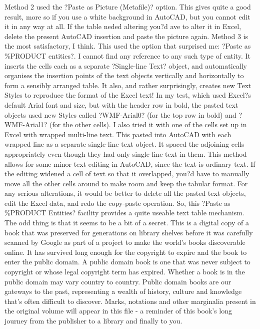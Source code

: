 \documentclass[a4paper]{article}
\begin{document}
{Method 2 used the ?Paste as Picture (Metafile)? option. This gives quite a good result, more so if you use a white background in AutoCAD, but you cannot edit it in any way at all. If the table neded altering you?d ave to alter it in Excel, delete the present AutoCAD insertion and paste the picture again.
Method 3 is the most satisfactory, I think. This used the option that surprised me: ?Paste as \%PRODUCT entities?. I cannot find any reference to any such type of entity. It inserts the cells each as a separate ?Single-line Text? object, and automatically organises the insertion points of the text objects vertically and horizontally to form a sensibly arranged table. It also, and rather surprisingly, creates new Text Styles to reproduce the format of the Excel text! In my test, which used Excel?s default Arial font and size, but with the header row in bold, the pasted text objects used new Styles called ?WMF-Arial0? (for the top row in bold) and ?WMF-Arial1? (for the other cells).
I also tried it with one of the cells set up in Excel with wrapped multi-line text. This pasted into AutoCAD with each wrapped line as a separate single-line text object. It spaced the adjoining cells appropriately even though they had only single-line text in them.
This method allows for some minor text editing in AutoCAD, since the text is ordinary text. If the editing widened a cell of text so that it overlapped, you?d have to manually move all the other cells around to make room and keep the tabular format. For any serious alterations, it would be better to delete all the pasted text objects, edit the Excel data, and redo the copy-paste operation.
So, this ?Paste as \%PRODUCT Entities? facility provides a quite useable text table mechanism. The odd thing is that it seems to be a bit of a secret.
This is a digital copy of a book that was preserved for generations on library shelves before it was carefully scanned by Google as part of a project 
to make the world's books discoverable online. 
It has survived long enough for the copyright to expire and the book to enter the public domain. A public domain book is one that was never subject 
to copyright or whose legal copyright term has expired. Whether a book is in the public domain may vary country to country. Public domain books 
are our gateways to the past, representing a wealth of history, culture and knowledge that's often difficult to discover. 
Marks, notations and other marginalia present in the original volume will appear in this file - a reminder of this book's long journey from the 
publisher to a library and finally to you. 
}
\end{document}
